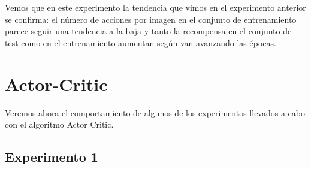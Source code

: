 Vemos que en este experimento la tendencia que vimos en el experimento anterior se confirma: el número de acciones por imagen en el conjunto de entrenamiento parece seguir una tendencia a la baja y tanto la recompensa en el conjunto de test como en el entrenamiento aumentan según van avanzando las épocas.
\medskip

\section{Actor-Critic}
\label{resultados-actor-critic}

Veremos ahora el comportamiento de algunos de los experimentos llevados a cabo con el algoritmo Actor Critic.
\medskip

\subsection{Experimento 1}
\label{resultados-actor-critic-experimento-1}

